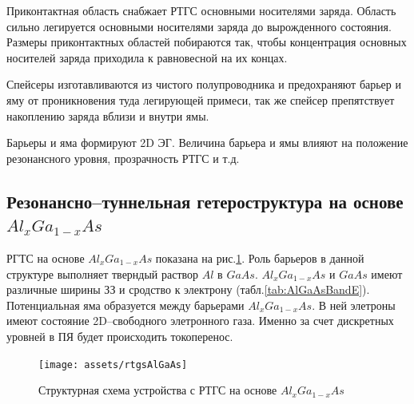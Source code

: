 Приконтактная область снабжает РТГС основными носителями заряда. Область сильно легируется основными носителями заряда до вырожденного состояния. Размеры приконтактных областей побираются так, чтобы концентрация основных носителей заряда приходила к равновесной на их концах.

Спейсеры изготавливаются из чистого полупроводника и предохраняют барьер и яму от проникновения туда легирующей примеси, так же спейсер препятствует накоплению заряда вблизи и внутри ямы.

Барьеры и яма формируют 2D ЭГ. Величина барьера и ямы влияют на положение резонансного уровня, прозрачность РТГС и т.д.

\subsection{Резонансно--туннельная гетероструктура на основе $Al_{x}Ga_{1-x}As$}
РГТС на основе $Al_{x}Ga_{1-x}As$ показана на рис.\ref{img:rtgsAlGaAs}. Роль барьеров в данной структуре выполняет тверндый раствор $Al$ в $GaAs$. $Al_{x}Ga_{1-x}As$ и $GaAs$ имеют различные ширины ЗЗ и сродство к электрону (табл.\ref{tab:AlGaAsBandE}). Потенциальная яма образуется между барьерами $Al_{x}Ga_{1-x}As$. В ней элетроны имеют состояние 2D--свободного элетронного газа. Именно за счет дискретных уровней в ПЯ будет происходить токоперенос.

\begin{figure}[h]
  \centering
  \texttt{[image: assets/rtgsAlGaAs]}
  \caption{Структурная схема устройства с РТГС на основе $Al_{x}Ga_{1-x}As$}
  \label{img:rtgsAlGaAs}
\end{figure}







